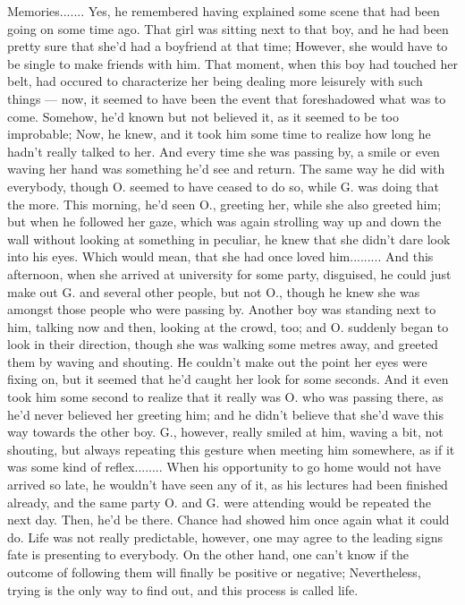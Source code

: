 Memories.......
Yes, he remembered having explained some scene that had been going on some time ago. That girl was sitting next to that boy, and he had been pretty sure that she'd had a boyfriend at that time; However, she would have to be single to make friends with him. That moment, when this boy had touched her belt, had occured to characterize her being dealing more leisurely with such things --- now, it seemed to have been the event that foreshadowed what was to come. Somehow, he'd known but not believed it, as it seemed to be too improbable; Now, he knew, and it took him some time to realize how long he hadn't really talked to her. And  every time she was passing by, a smile or even waving her hand was something he'd see and return. 
The same way he did with everybody, though O. seemed to have ceased to do so, while G. was doing that the more. 
This morning, he'd seen O., greeting her, while she also greeted him; but when he followed her gaze, which was again strolling way up and down the wall without looking at something in peculiar, he knew that she didn't dare look into his eyes. Which would mean, that she had once loved him.........
And this afternoon, when she arrived at university for some party, disguised, he could just make out G. and several other people, but not O., though he knew she was amongst those people who were passing by. Another boy was standing next to him, talking now and then, looking at the crowd, too; and O. suddenly began to look in their direction, though she was walking some metres away, and greeted them by waving and shouting. He couldn't make out the point her eyes were fixing on, but it seemed that he'd caught her look for some seconds. And it even took him some second to realize that it really was O. who was passing there, as he'd never believed her greeting him; and he didn't believe that she'd wave this way towards the other boy. G., however, really smiled at him, waving a bit, not shouting, but always repeating this gesture when meeting him somewhere, as if it was some kind of reflex........
When his opportunity to go home would not have arrived so late, he wouldn't have seen any of it, as his lectures had been finished already, and the same party O. and G. were attending would be repeated the next day. Then, he'd be there. 
Chance had showed him once again what it could do. Life was not really predictable, however, one may agree to the leading signs fate is presenting to everybody. On the other hand, one can't know if the outcome of following them will finally be positive or negative; Nevertheless, trying is the only way to find out, and this process is called life. 
